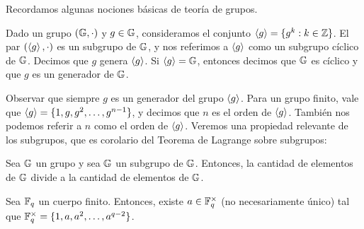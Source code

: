 Recordamos algunas nociones básicas de teoría de grupos.

\begin{definition}
\label{def:apendice-a-cuerpos-finitos-subgrupo-grupo-ciclico-generador}
	Dado un grupo $(\mathbb{G}, \cdot)$ y $g \in \mathbb{G}$, consideramos el conjunto $\left\langle g \right\rangle = \{g^k: k \in \mathbb{Z}\}$. El par $(\left\langle g \right\rangle, \cdot)$ es un subgrupo de $\mathbb{G}$, y nos referimos a $\left\langle g \right\rangle$ como un subgrupo cíclico de $\mathbb{G}$. Decimos que $g$ genera $\left\langle g \right\rangle$. Si $\left\langle g \right\rangle = \mathbb{G}$, entonces decimos que $\mathbb{G}$ es cíclico y que $g$ es un generador de $\mathbb{G}$.
\end{definition}

Observar que siempre $g$ es un generador del grupo $\left\langle g \right\rangle$. Para un grupo finito, vale que $\left\langle g \right\rangle = \{1, g, g^2, \ldots, g^{n-1}\}$, y decimos que $n$ es el orden de $\left\langle g \right\rangle$. También nos podemos referir a $n$ como el orden de $\left\langle g \right\rangle$. Veremos una propiedad relevante de los subgrupos, que es corolario del Teorema de Lagrange sobre subgrupos:

\begin{theorem}
	Sea $\mathbb{G}$ un grupo y sea $\mathbb{G}$ un subgrupo de $\mathbb{G}$. Entonces, la cantidad de elementos de $\mathbb{G}$ divide a la cantidad de elementos de $\mathbb{G}$.
\end{theorem}

\begin{theorem}
	Sea $\mathbb{F}_q$ un cuerpo finito. Entonces, existe $a \in \mathbb{F}_{q}^{\times}$ (no necesariamente único) tal que $\mathbb{F}_{q}^{\times} = \{1, a, a^2, \ldots, a^{q-2}\}$.
\end{theorem}
